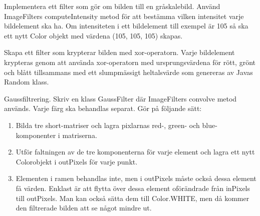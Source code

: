 \Task Implementera ett filter som gör om bilden till en gråskalebild. Använd ImageFilters computeIntensity metod för att bestämma vilken intensitet varje bildelement ska ha. Om intensiteten i ett bildelement till exempel är 105 så ska ett nytt Color objekt med värdena (105, 105, 105) skapas.

\Task Skapa ett filter som krypterar bilden med xor-operatorn. Varje bildelement krypteras genom att använda xor-operatorn med ursprungsvärdena för rött, grönt och blått tillsammans med ett slumpmässigt heltalsvärde som genereras av Javas Random klass.



\Task Gaussfiltrering. Skriv en klass GaussFilter där ImageFilters convolve metod används. Varje färg ska behandlas separat. Gör på följande sätt:
\begin{enumerate}
	\item Bilda tre short-matriser och lagra pixlarnas red-, green- och blue-komponenter i matriserna.
	\item Utför faltningen av de tre komponenterna för varje element och lagra ett nytt Colorobjekt i outPixels för varje punkt.
	\item Elementen i ramen behandlas inte, men i outPixels måste också dessa element få värden. Enklast är att flytta över dessa element oförändrade från inPixels till outPixels. Man kan också sätta dem till Color.WHITE, men då kommer den filtrerade bilden att se något mindre ut.
\end{enumerate}

